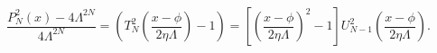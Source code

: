 \begin{equation}
\frac{P_{N}^2(x) - 4\Lambda^{2N}}{4 \Lambda^{2N}} = \left( T_N^2(\frac{x-\phi}{2\eta \Lambda}) -1 \right) =  \left[ \left(\frac{x-\phi}{2\eta \Lambda}\right)^2 -1 \right] U_{N-1}^2\left(\frac{x-\phi}{2\eta \Lambda}\right).
\end{equation}

